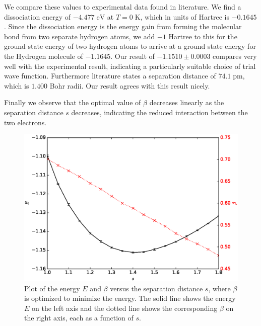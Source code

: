\documentclass[twoside]{article}
\newcommand{\unit}[1]{\ensuremath{\; \mathrm{#1}}}
\begin{document}
We compare these values to experimental data found in literature\cite{ref_NIST}\cite{ref_Grinter}. We find a dissociation energy of $-4.477 \unit{eV}$ at $T=0 \unit{K}$, which in units of Hartree is $-0.1645$. Since the dissociation energy is the energy gain from forming the molecular bond from two separate hydrogen atoms, we add $-1$ Hartree to this for the ground state energy of two hydrogen atoms to arrive at a ground state energy for the Hydrogen molecule of $-1.1645$. Our result of $-1.1510 \pm 0.0003$ compares very well with the experimental result, indicating a particularly suitable choice of trial wave function. Furthermore literature states a separation distance of $74.1 \unit{pm}$, which is $1.400$ Bohr radii. Our result agrees with this result nicely.

Finally we observe that the optimal value of $\beta$ decreases linearly as the separation distance $s$ decreases, indicating the reduced interaction between the two electrons.

\begin{figure}
	\centering
	\includegraphics[width=0.8\linewidth]{figs/EvsS_optimalBeta.eps}
	\caption{Plot of the energy $E$ and $\beta$ versus the separation distance $s$, where $\beta$ is optimized to minimize the energy. The solid line shows the energy $E$ on the left axis and the dotted line shows the corresponding $\beta$ on the right axis, each as a function of $s$.}
	\label{fig:EvsS_optimalBeta}
\end{figure}
\end{document}
